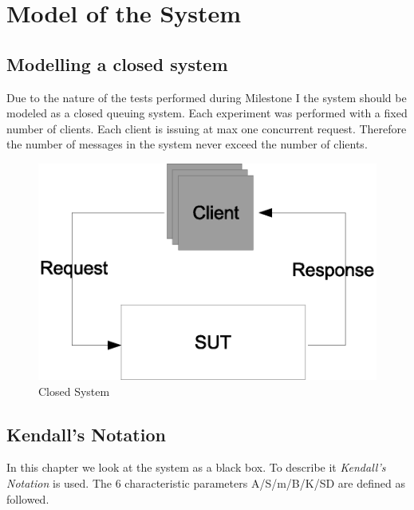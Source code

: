 \documentclass[a4paper]{article}
\begin{document}
\section{Model of the System}

\subsection{Modelling a closed system}
Due to the nature of the tests performed during Milestone I the system should be modeled as a closed queuing system. Each experiment was performed with a fixed number of clients. Each client is issuing at max one concurrent request. Therefore the number of messages in the system never exceed the number of clients.



\begin{figure}[H]
	\begin{center}
    \includegraphics[scale=0.4]{../drawings-ms2/sut.eps}
  \end{center}
  \caption{Closed System}
  \label{fig:closedsystem}
\end{figure}




\subsection{Kendall's Notation}
In this chapter we look at the system as a black box. To describe it \textit{Kendall's Notation} is used. The 6 characteristic parameters A/S/m/B/K/SD are defined as followed.
\end{document}
